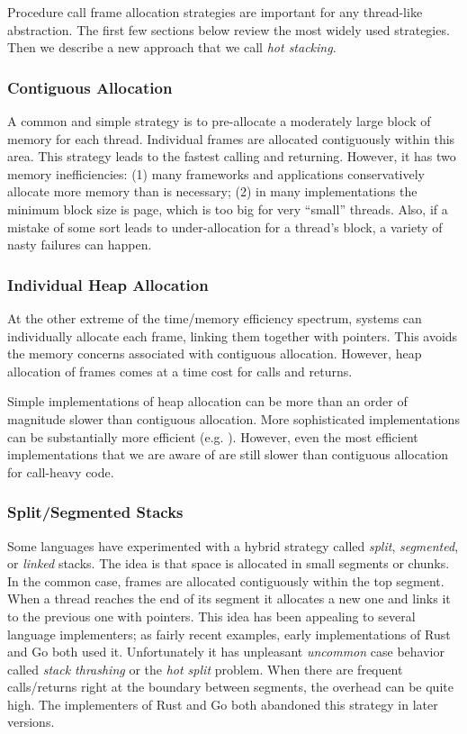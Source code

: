 \documentclass[acmsmall,anonymous,review]{acmart}\settopmatter{printfolios=true,printccs=false,printacmref=false}
\begin{document}
Procedure call frame allocation strategies are important for any thread-like abstraction.
The first few sections below review the most widely used strategies.
Then we describe a new approach that we call \emph{hot stacking}.

\subsubsection{Contiguous Allocation}

A common and simple strategy is to pre-allocate a moderately large block of memory for each thread.
Individual frames are allocated contiguously within this area.
This strategy leads to the fastest calling and returning.
However, it has two memory inefficiencies: (1) many frameworks and applications conservatively allocate more memory than is necessary; (2) in many implementations the minimum block size is page, which is too big for very ``small'' threads.
Also, if a mistake of some sort leads to under-allocation for a thread's block, a variety of nasty failures can happen.

\subsubsection{Individual Heap Allocation}

At the other extreme of the time/memory efficiency spectrum, systems can individually allocate each frame, linking them together with pointers.
This avoids the memory concerns associated with contiguous allocation.
However, heap allocation of frames comes at a time cost for calls and returns.

Simple implementations of heap allocation can be more than an order of magnitude slower than contiguous allocation.
More sophisticated implementations can be substantially more efficient (e.g. \cite{Shao2000}).
However, even the most efficient implementations that we are aware of are still slower than contiguous allocation for call-heavy code.

\subsubsection{Split/Segmented Stacks}

Some languages have experimented with a hybrid strategy called \emph{split}, \emph{segmented}, or \emph{linked} stacks.
The idea is that space is allocated in small segments or chunks.
In the common case, frames are allocated contiguously within the top segment.
When a thread reaches the end of its segment it allocates a new one and links it to the previous one with pointers.
This idea has been appealing to several language implementers; as fairly recent examples, early implementations of Rust and Go both used it.
Unfortunately it has unpleasant \emph{uncommon} case behavior called \emph{stack thrashing} or the \emph{hot split} problem.
When there are frequent calls/returns right at the boundary between segments, the overhead can be quite high.
The implementers of Rust \cite{Anderson2013} and Go \cite{Anastasopoulos2014} both abandoned this strategy in later versions.
\end{document}
